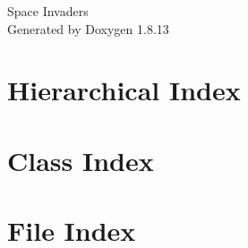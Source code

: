 \documentclass[twoside]{book}
\newcommand{\+}{\discretionary{\mbox{\scriptsize$\hookleftarrow$}}{}{}}
\newcommand{\clearemptydoublepage}{%
  \newpage{\pagestyle{empty}\cleardoublepage}%
}
\begin{document}
\hypersetup{pageanchor=false,
             bookmarksnumbered=true,
             pdfencoding=unicode
            }
\begin{titlepage}
\vspace*{7cm}
\begin{center}%
{\Large Space Invaders }\\
\vspace*{1cm}
{\large Generated by Doxygen 1.8.13}\\
\end{center}
\end{titlepage}
\clearemptydoublepage
{}
\tableofcontents
\clearemptydoublepage
{}
\hypersetup{pageanchor=true}

\chapter{Hierarchical Index}

\chapter{Class Index}

\chapter{File Index}

\end{document}
